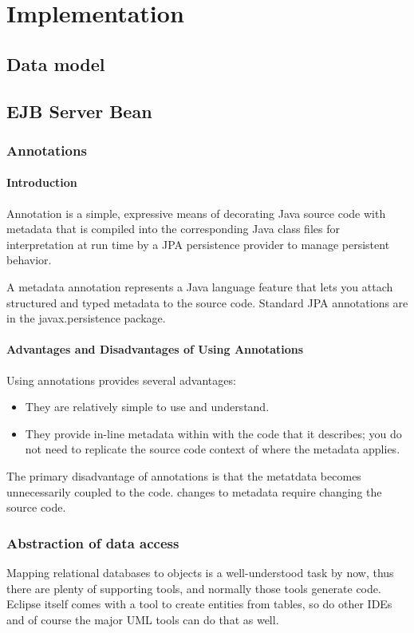 \chapter{Implementation}
\section{Data model}

\section{EJB Server Bean}

\subsection{Annotations}
\subsubsection{Introduction}
Annotation is a simple, expressive means of decorating Java source code with metadata that is compiled into the corresponding Java class files for interpretation at run time by a JPA persistence provider to manage persistent behavior.

A metadata annotation represents a Java language feature that lets you attach structured and typed metadata to the source code. Standard JPA annotations are in the javax.persistence package. 

\subsubsection{Advantages and Disadvantages of Using Annotations}
Using annotations provides several advantages:
\begin{itemize}
\item They are relatively simple to use and understand.
\item They provide in-line metadata within with the code that it describes; you do not need to replicate the source code context of where the metadata applies. 
\end{itemize}

The primary disadvantage of annotations is that the metatdata becomes unnecessarily coupled to the code. changes to metadata require changing the source code. 

\subsection{Abstraction of data access}
Mapping relational databases to objects is a well-understood task by now, thus there are plenty of supporting tools, and normally those tools generate code. Eclipse itself comes with a tool to create entities from tables, so do other IDEs and of course the major UML tools can do that as well.

